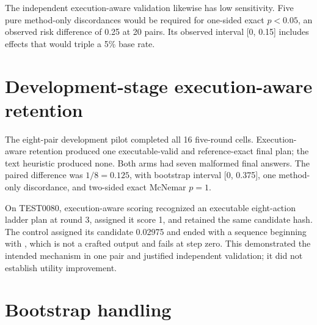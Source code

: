 The independent execution-aware validation likewise has low sensitivity. Five pure method-only discordances would be required for one-sided exact \(p<0.05\), an observed risk difference of 0.25 at 20 pairs. Its observed interval [0, 0.15] includes effects that would triple a 5\% base rate.

\section{Development-stage execution-aware retention}
\label{app:retention}

The eight-pair development pilot completed all 16 five-round cells. Execution-aware retention produced one executable-valid and reference-exact final plan; the text heuristic produced none. Both arms had seven malformed final answers. The paired difference was \(1/8=0.125\), with bootstrap interval [0, 0.375], one method-only discordance, and two-sided exact McNemar \(p=1\).

\begin{center}
\end{center}

On TEST0080, execution-aware scoring recognized an executable eight-action ladder plan at round 3, assigned it score 1, and retained the same candidate hash. The control assigned its candidate 0.02975 and ended with a sequence beginning with \texttt{}, which is not a crafted output and fails at step zero. This demonstrated the intended mechanism in one pair and justified independent validation; it did not establish utility improvement.

\section{Bootstrap handling}
\label{app:bootstrap}

